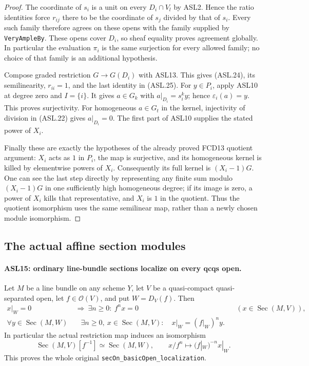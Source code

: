 \begin{proof}
The coordinate of $s_i$ is a unit on every $D_i\cap V_l$ by
ASL2.  Hence the ratio identities force $r_{ij}$ there to be
the coordinate of $s_j$ divided by that of $s_i$.  Every such
family therefore agrees on these opens with the family supplied
by \texttt{Very\allowbreak{}Ample\allowbreak{}By}.  These opens cover $D_i$,
so sheaf equality proves agreement globally.  In particular the
evaluation $\pi_i$ is the same surjection for every allowed family;
no choice of that family is an additional hypothesis.

Compose graded restriction $G\to G(D_i)$ with ASL13.
This gives (ASL.24), its semilinearity, $r_{ii}=1$, and the
last identity in (ASL.25).
For $y\in P_i$, apply ASL10 at degree zero and $I=\{i\}$.
It gives $a\in G_k$ with $a|_{D_i}=s_i^ky$; hence
$\varepsilon_i(a)=y$.  This proves surjectivity.
For homogeneous $a\in G_t$ in the kernel, injectivity of
division in (ASL.22) gives $a|_{D_i}=0$.  The first part of
ASL10 supplies the stated power of $X_i$.

Finally these are exactly the hypotheses of the already proved
FCD13 quotient argument: $X_i$ acts as $1$ in $P_i$, the map
is surjective, and its homogeneous kernel is killed by elementwise
powers of $X_i$.  Consequently its full kernel is $(X_i-1)G$.
One can see the last step directly by representing any finite sum
modulo $(X_i-1)G$ in one sufficiently high homogeneous degree;
if its image is zero, a power of $X_i$ kills that representative,
and $X_i$ is $1$ in the quotient.  Thus the quotient isomorphism
uses the same semilinear map, rather than a newly chosen module
isomorphism.
\end{proof}

\subsection{The actual affine section modules}

\paragraph{ASL15: ordinary line-bundle sections localize on every qcqs open.}
\label{claim:ASL15}
Let $M$ be a line bundle on any scheme $Y$, let $V$ be a
quasi-compact quasi-separated open, let $f\in\mathcal O(V)$,
and put $W=D_V(f)$.  Then
\[
 \begin{aligned}
 x|_W=0&\ \Longrightarrow\ \exists n\ge0:\ f^nx=0
                    &&(x\in\operatorname{Sec}(M,V)),\\
 \forall y\in\operatorname{Sec}(M,W)&\quad
 \exists n\ge0,\ x\in\operatorname{Sec}(M,V):\quad
                    x|_W=(f|_W)^ny.
 \end{aligned}                                            \tag{ASL.26}
\]
In particular the actual restriction map induces an isomorphism
\[
 \operatorname{Sec}(M,V)[f^{-1}]
                      \simeq\operatorname{Sec}(M,W),
 \qquad x/f^n\longmapsto(f|_W)^{-n}x|_W.            \tag{ASL.27}
\]
This proves the whole original \texttt{sec\allowbreak{}On\_\allowbreak{}basic\allowbreak{}Open\_\allowbreak{}localization}.

